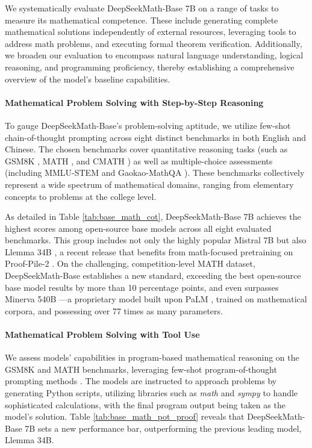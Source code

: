 We systematically evaluate DeepSeekMath-Base 7B on a range of tasks to measure its mathematical competence. These include generating complete mathematical solutions independently of external resources, leveraging tools to address math problems, and executing formal theorem verification. Additionally, we broaden our evaluation to encompass natural language understanding, logical reasoning, and programming proficiency, thereby establishing a comprehensive overview of the model’s baseline capabilities.

\paragraph{Mathematical Problem Solving with Step-by-Step Reasoning}

To gauge DeepSeekMath-Base's problem-solving aptitude, we utilize few-shot chain-of-thought prompting \citep{cot} across eight distinct benchmarks in both English and Chinese. The chosen benchmarks cover quantitative reasoning tasks (such as GSM8K \citep{gsm8k}, MATH \citep{MATH}, and CMATH \citep{wei2023cmath}) as well as multiple-choice assessments (including MMLU-STEM \citep{mmlu} and Gaokao-MathQA \citep{agieval}). These benchmarks collectively represent a wide spectrum of mathematical domains, ranging from elementary concepts to problems at the college level.

As detailed in Table \ref{tab:base_math_cot}, DeepSeekMath-Base 7B achieves the highest scores among open-source base models across all eight evaluated benchmarks. This group includes not only the highly popular Mistral 7B \citep{mistral} but also Llemma 34B \citep{llemma}, a recent release that benefits from math-focused pretraining on Proof-Pile-2 \citep{llemma}. On the challenging, competition-level MATH dataset, DeepSeekMath-Base establishes a new standard, exceeding the best open-source base model results by more than 10 percentage points, and even surpasses Minerva 540B \citep{minerva}—a proprietary model built upon PaLM \citep{palm}, trained on mathematical corpora, and possessing over 77 times as many parameters.

\paragraph{Mathematical Problem Solving with Tool Use} 

We assess models' capabilities in program-based mathematical reasoning on the GSM8K and MATH benchmarks, leveraging few-shot program-of-thought prompting methods \citep{pot,pal}. The models are instructed to approach problems by generating Python scripts, utilizing libraries such as \textit{math} and \textit{sympy} to handle sophisticated calculations, with the final program output being taken as the model’s solution. Table \ref{tab:base_math_pot_proof} reveals that DeepSeekMath-Base 7B sets a new performance bar, outperforming the previous leading model, Llemma 34B.


